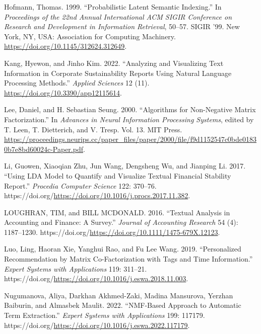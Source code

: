 \documentclass[
]{article}
\newlength{\cslhangindent}
\newlength{\cslentryspacingunit} %
\newenvironment{CSLReferences}[2] %
 {%
  \setlength{\parindent}{0pt}
  \ifodd #1
  \let\oldpar\par
  \def\par{\hangindent=\cslhangindent\oldpar}
  \fi
  \setlength{\parskip}{#2\cslentryspacingunit}
 }%
 {}
\begin{document}
\begin{CSLReferences}{1}{0}
\leavevmode{}%
Hofmann, Thomas. 1999. {``Probabilistic Latent Semantic Indexing.''} In \emph{Proceedings of the 22nd Annual International ACM SIGIR Conference on Research and Development in Information Retrieval}, 50--57. SIGIR '99. New York, NY, USA: Association for Computing Machinery. \url{https://doi.org/10.1145/312624.312649}.

\leavevmode{}%
Kang, Hyewon, and Jinho Kim. 2022. {``Analyzing and Visualizing Text Information in Corporate Sustainability Reports Using Natural Language Processing Methods.''} \emph{Applied Sciences} 12 (11). \url{https://doi.org/10.3390/app12115614}.

\leavevmode{}%
Lee, Daniel, and H. Sebastian Seung. 2000. {``Algorithms for Non-Negative Matrix Factorization.''} In \emph{Advances in Neural Information Processing Systems}, edited by T. Leen, T. Dietterich, and V. Tresp. Vol. 13. MIT Press. \url{https://proceedings.neurips.cc/paper_files/paper/2000/file/f9d1152547c0bde01830b7e8bd60024c-Paper.pdf}.

\leavevmode{}%
Li, Guowen, Xiaoqian Zhu, Jun Wang, Dengsheng Wu, and Jianping Li. 2017. {``Using LDA Model to Quantify and Visualize Textual Financial Stability Report.''} \emph{Procedia Computer Science} 122: 370--76. https://doi.org/\url{https://doi.org/10.1016/j.procs.2017.11.382}.

\leavevmode{}%
LOUGHRAN, TIM, and BILL MCDONALD. 2016. {``Textual Analysis in Accounting and Finance: A Survey.''} \emph{Journal of Accounting Research} 54 (4): 1187--1230. https://doi.org/\url{https://doi.org/10.1111/1475-679X.12123}.

\leavevmode{}%
Luo, Ling, Haoran Xie, Yanghui Rao, and Fu Lee Wang. 2019. {``Personalized Recommendation by Matrix Co-Factorization with Tags and Time Information.''} \emph{Expert Systems with Applications} 119: 311--21. https://doi.org/\url{https://doi.org/10.1016/j.eswa.2018.11.003}.

\leavevmode{}%
Nugumanova, Aliya, Darkhan Akhmed-Zaki, Madina Mansurova, Yerzhan Baiburin, and Almasbek Maulit. 2022. {``NMF-Based Approach to Automatic Term Extraction.''} \emph{Expert Systems with Applications} 199: 117179. https://doi.org/\url{https://doi.org/10.1016/j.eswa.2022.117179}.


\end{CSLReferences}
\end{document}
